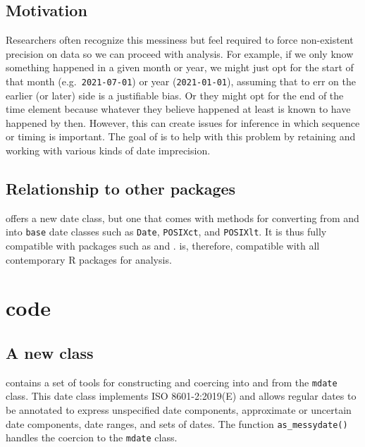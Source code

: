 \documentclass[
]{jss}
\begin{document}
\hypertarget{motivation}{%
\subsection{Motivation}\label{motivation}}

Researchers often recognize this messiness but feel required to force
non-existent precision on data so we can proceed with analysis. For
example, if we only know something happened in a given month or year, we
might just opt for the start of that month (e.g.~\texttt{2021-07-01}) or
year (\texttt{2021-01-01}), assuming that to err on the earlier (or
later) side is a justifiable bias. Or they might opt for the end of the
time element because whatever they believe happened at least is known to
have happened by then. However, this can create issues for inference in
which sequence or timing is important. The goal of  is
to help with this problem by retaining and working with various kinds of
date imprecision.

\hypertarget{relationship-to-other-packages}{%
\subsection{Relationship to other
packages}\label{relationship-to-other-packages}}

 offers a new date class, but one that comes with
methods for converting from and into \texttt{base} date classes such as
\texttt{Date}, \texttt{POSIXct}, and \texttt{POSIXlt}. It is thus fully
compatible with packages such as 
\citep{grolemundDatesTimesMade2011} and 
\citep{eddelbuettelAnytimeEasierDate2019}.  is,
therefore, compatible with all contemporary R packages for analysis.

\section[R code]{ code}\label{r-code}

\hypertarget{a-new-class}{%
\subsection{A new class}\label{a-new-class}}

 contains a set of tools for constructing and coercing
into and from the \texttt{mdate} class. This date class implements ISO
8601-2:2019(E) and allows regular dates to be annotated to express
unspecified date components, approximate or uncertain date components,
date ranges, and sets of dates. The function \texttt{as\_messydate()}
handles the coercion to the \texttt{mdate} class.
\end{document}
